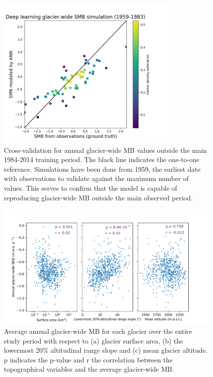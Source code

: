 \begin{figure}[t]
\centering
\includegraphics[width=9cm]{Figures/past/Figure_S5.png}
\captionsetup{justification=centering}
\caption{Cross-validation for annual glacier-wide MB values outside the main 1984-2014 training period. The black line indicates the one-to-one reference. Simulations have been done from 1959, the earliest date with observations to validate against the maximum number of values. This serves to confirm that the model is capable of reproducing glacier-wide MB outside the main observed period.}
\label{past:figS5}
\end{figure}


\begin{figure}[t]
\centering
\includegraphics[width=16cm]{Figures/past/Figure_S6.pdf}
\captionsetup{justification=centering}
\caption{Average annual glacier-wide MB for each glacier over the entire study period with respect to (a) glacier surface area, (b) the lowermost 20\% altitudinal range slope and (c) mean glacier altitude. p indicates the p-value and r the correlation between the topographical variables and the average glacier-wide MB.}
\label{past:figS6}
\end{figure}


